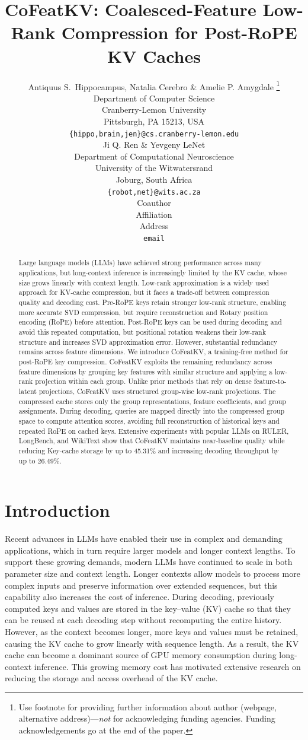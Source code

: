 \documentclass{article} %
\title{CoFeatKV: Coalesced-Feature Low-Rank Compression for Post-RoPE KV Caches}
\author{Antiquus S.~Hippocampus, Natalia Cerebro \& Amelie P. Amygdale \thanks{ Use footnote for providing further information
about author (webpage, alternative address)---\emph{not} for acknowledging
funding agencies.  Funding acknowledgements go at the end of the paper.} \\
Department of Computer Science\\
Cranberry-Lemon University\\
Pittsburgh, PA 15213, USA \\
\texttt{\{hippo,brain,jen\}@cs.cranberry-lemon.edu} \\
\And
Ji Q. Ren \& Yevgeny LeNet \\
Department of Computational Neuroscience \\
University of the Witwatersrand \\
Joburg, South Africa \\
\texttt{\{robot,net\}@wits.ac.za} \\
\AND
Coauthor \\
Affiliation \\
Address \\
\texttt{email}
}
\begin{document}
\maketitle

\begin{abstract}
Large language models (LLMs) have achieved strong performance across many
applications, but long-context inference is increasingly limited by the KV
cache, whose size grows linearly with context length. Low-rank approximation
is a widely used approach for KV-cache compression, but it faces a trade-off
between compression quality and decoding cost. Pre-RoPE keys retain stronger
low-rank structure, enabling more accurate SVD compression, but require
reconstruction and Rotary position encoding (RoPE) before attention. Post-RoPE keys can be used 
during decoding and avoid this repeated computation, but positional rotation
weakens their low-rank structure and increases SVD approximation error. However, 
substantial redundancy remains across feature dimensions.
We introduce CoFeatKV, a training-free method for post-RoPE key
compression. CoFeatKV exploits the remaining redundancy across feature
dimensions by grouping key features with similar structure and applying a
low-rank projection within each group. Unlike prior methods that rely on dense
feature-to-latent projections, CoFeatKV uses structured group-wise low-rank
projections. The compressed cache stores only the group representations,
feature coefficients, and group assignments. During decoding, queries are
mapped directly into the compressed group space to compute attention scores,
avoiding full reconstruction of historical keys and repeated RoPE on cached
keys.
Extensive experiments with popular LLMs on RULER, LongBench, and WikiText
show that CoFeatKV maintains near-baseline quality while reducing Key-cache
storage by up to 45.31\% and increasing decoding throughput by up to 26.49\%.

\end{abstract}

\section{Introduction}
 
Recent advances in LLMs have enabled their use in complex and demanding
applications, which in turn require larger models and longer context lengths.
To support these growing demands, modern LLMs have continued to scale in both
parameter size and context length. Longer contexts allow models to process more
complex inputs and preserve information over extended sequences, but this
capability also increases the cost of inference. During decoding, previously
computed keys and values are stored in the key--value (KV) cache so that they
can be reused at each decoding step without recomputing the entire history.
However, as the context becomes longer, more keys and values must be retained,
causing the KV cache to grow linearly with sequence length. As a result, the KV
cache can become a dominant source of GPU memory consumption during long-context
inference. This growing memory cost has motivated extensive research on reducing
the storage and access overhead of the KV cache.
\end{document}
